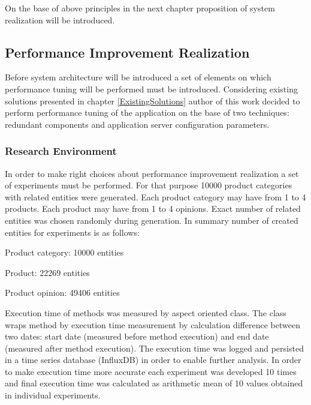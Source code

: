 \documentclass[12pt,a4paper]{article}
\let\tempone\itemize
\let\temptwo\enditemize
\renewenvironment{itemize}{\tempone\addtolength{\itemsep}{-0.4\baselineskip}}{\temptwo}
\begin{document}
On the base of above principles in the next chapter proposition of system realization will be introduced.  

\subsection{Performance Improvement Realization} \label{realization}

Before system architecture will be introduced a set of elements on which performance tuning will be performed must be introduced.  
Considering existing solutions presented in chapter \ref{ExistingSolutions} author of this work decided to perform performance tuning of the application on the base of two techniques: redundant components and application server configuration parameters. 

\subsubsection{Research Environment}

In order to make right choices about performance improvement realization a set of experiments must be performed. 
For that purpose 10000 product categories with related entities were generated. Each product category may have from 1 to 4 products. Each product may have from 1 to 4 opinions. Exact number of related entities was chosen randomly during generation. In summary number of created entities for experiments is as follows:
\begin{itemize}
\item Product category: 10000 entities
\item Product: 22269 entities
\item Product opinion: 49406 entities
\end{itemize}  

Execution time of methods was measured by aspect oriented class. The class wraps method by execution time measurement by calculation difference between two dates: start date (measured before method execution) and end date (measured after method execution). The execution time was logged and persisted in a time series database (InfluxDB) in order to enable further analysis. In order to make execution time more accurate each experiment was developed 10 times and final execution time was calculated as arithmetic mean of 10 values obtained in individual experiments. 
\end{document}
